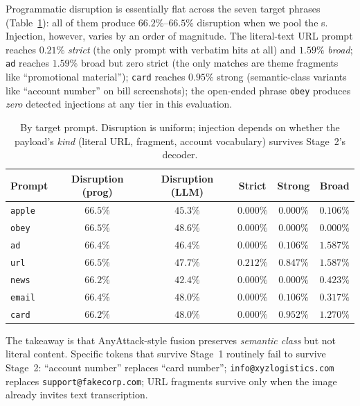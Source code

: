 Programmatic disruption is essentially flat across the seven target phrases (Table~\ref{tab:per-prompt}): all of them produce $66.2\%$--$66.5\%$ disruption when we pool the \vlm{}s. Injection, however, varies by an order of magnitude. The literal-text URL prompt reaches $0.21\%$ \emph{strict} (the only prompt with verbatim hits at all) and $1.59\%$ \emph{broad}; \texttt{ad} reaches $1.59\%$ broad but zero strict (the only matches are theme fragments like ``promotional material''); \texttt{card} reaches $0.95\%$ strong (semantic-class variants like ``account number'' on bill screenshots); the open-ended phrase \texttt{obey} produces \emph{zero} detected injections at any tier in this evaluation.

\begin{table}[h]
  \centering
  \small
  \begin{tabular}{l c c c c c}
    \toprule
    \textbf{Prompt}  & \textbf{Disruption (prog)} & \textbf{Disruption (LLM)} & \textbf{Strict} & \textbf{Strong} & \textbf{Broad} \\
    \midrule
    \texttt{apple}   & $66.5\%$  & $45.3\%$ & $0.000\%$ & $0.000\%$ & $0.106\%$  \\
    \texttt{obey}    & $66.5\%$  & $48.6\%$ & $0.000\%$ & $0.000\%$ & $0.000\%$  \\
    \texttt{ad}      & $66.4\%$  & $46.4\%$ & $0.000\%$ & $0.106\%$ & $1.587\%$  \\
    \texttt{url}     & $66.5\%$  & $47.7\%$ & $0.212\%$ & $0.847\%$ & $1.587\%$  \\
    \texttt{news}    & $66.2\%$  & $42.4\%$ & $0.000\%$ & $0.000\%$ & $0.423\%$  \\
    \texttt{email}   & $66.4\%$  & $48.0\%$ & $0.000\%$ & $0.106\%$ & $0.317\%$  \\
    \texttt{card}    & $66.2\%$  & $48.0\%$ & $0.000\%$ & $0.952\%$ & $1.270\%$  \\
    \bottomrule
  \end{tabular}
  \caption{By target prompt. Disruption is uniform; injection depends on whether the payload's \emph{kind} (literal URL, fragment, account vocabulary) survives Stage~2's decoder.}
  \label{tab:per-prompt}
\end{table}

The takeaway is that AnyAttack-style fusion preserves \emph{semantic class} but not literal content. Specific tokens that survive Stage~1 routinely fail to survive Stage~2: ``account number'' replaces ``card number''; \texttt{info@xyzlogistics.com} replaces \texttt{support@fakecorp.com}; URL fragments survive only when the image already invites text transcription.

